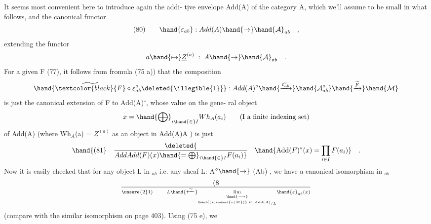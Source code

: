 It seems most convenient here to introduce again the  addi-%
t\uline{i}ve envelope  Add(A) of the category A,  which we'll assume to be small
in what follows,  and the canonical  functor
\[ (80) \qquad \hand{\varepsilon_{ab}} : Add(A) \hand{\to} \hand{\mathcal{A}}_{ab} \quad , \]
extending the functor
\[ a \hand{\mapsto} \underline{Z}^{(a)} \; : \; A \hand{\to} \hand{\mathcal{A}}_{ab} \quad . \]
For a given F (77),  it follows from fromula (75 a)) that the 
composition
\[ \hand{\widetilde{\textcolor{black}{F}}\circ\varepsilon^{\circ}_{ab}\deleted{\illegible{1}}} : Add(A)^{\circ} \hand{\xrightarrow{\varepsilon^{\circ}_{ab}}} \hand{\mathcal{A}^{\circ}_{ab}} \hand{\xrightarrow{\widetilde{F}}} \hand{\mathcal{M}} \]
is just the canonical extension  of F to Add(A)$^{\circ}$,  whose value on the gene-%
ral object
\[ x = \hand{\bigoplus}_{i\hand{\in}I} Wh_{A}(a_{i}) \qquad \text{(I a finite indexing set)} \]
of Add(A)  (where  Wh$_{A}$(a) = $\underline{Z}^{(a)}$ as an object in Add(A)\hand{$\subset$}A\hand{$^{\wedge}$} ) is just
\[ \hand{(81} \quad \deleted{\over{Add}{Add}(F)(x)\hand{=\bigoplus}_{i\hand{\in}I}F(a_{i})} \quad \hand{\mathrm{Add}(F)^{*}(x) = \prod_{i\in I} F(a_{i})} \quad . \]
Now it is easily checked that for any object L in $_{ab}$ i.e.  any sheaf
L: A$^{\circ}\hand{\to}$ (Ab) ,  we have a canonical isomorphism in $_{ab}$
\[ (8\over{\unsure{2}}{1}) \qquad L \hand{\xleftarrow{\sim}} \underset{\hand{(x,\unsure{u|M})}\text{ in }Add(A)_{/L}}{\underset{\hand{\longrightarrow}}{\mathrm{lim}}} \hand{\varepsilon}_{ab}(x) \]
(compare with the similar isomorphism on page 403).  Using (75 e),  we

